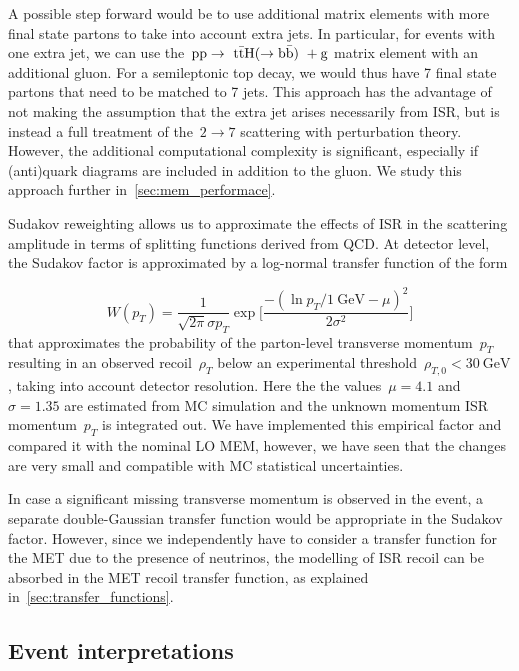 A possible step forward would be to use additional matrix elements with more final state partons to take into account extra jets. In particular, for events with one extra jet, we can use the~$\mathrm{pp} \rightarrow~\mathrm{t} \bar{\mathrm{t}} \mathrm{H} (\rightarrow \mathrm{b}\bar{\mathrm{b}})~+ \mathrm{g}$ matrix element with an additional gluon. For a semileptonic top decay, we would thus have 7 final state partons that need to be matched to 7 jets. This approach has the advantage of not making the assumption that the extra jet arises necessarily from ISR, but is instead a full treatment of the~$2 \rightarrow 7$ scattering with perturbation theory. However, the additional computational complexity is significant, especially if (anti)quark diagrams are included in addition to the gluon. We study this approach further in~\cref{sec:mem_performace}.

Sudakov reweighting allows us to approximate the effects of ISR in the scattering amplitude in terms of splitting functions derived from QCD. At detector level, the Sudakov factor is approximated by a log-normal transfer function of the form

\begin{equation}
W(p_T) = \frac{1}{\sqrt{2\pi} \sigma p_T} \exp \biggl[ \frac{-(\ln{p_T/1~\mathrm{GeV}} - \mu)^2}{2\sigma^2}\biggr]
\end{equation}
that approximates the probability of the parton-level transverse momentum~$p_T$ resulting in an observed recoil~$\rho_T$ below an experimental threshold~$\rho_{T,0} < 30~\mathrm{GeV}$, taking into account detector resolution. Here the the values~$\mu = 4.1$ and~$\sigma = 1.35$ are estimated from MC simulation and the unknown momentum ISR momentum~$p_T$ is integrated out. We have implemented this empirical factor and compared it with the nominal LO MEM, however, we have seen that the changes are very small and compatible with MC statistical uncertainties. 

In case a significant missing transverse momentum is observed in the event, a separate double-Gaussian transfer function would be appropriate in the Sudakov factor. However, since we independently have to consider a transfer function for the MET due to the presence of neutrinos, the modelling of ISR recoil can be absorbed in the MET recoil transfer function, as explained in~\cref{sec:transfer_functions}.

\subsection{Event interpretations}
\label{sec:event_interpretation}

